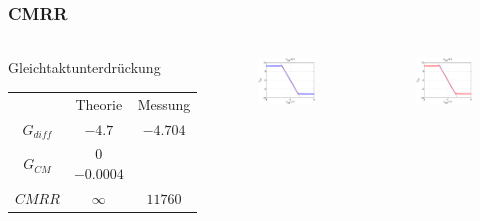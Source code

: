\begin{frame}
\frametitle{CMRR}
\framesubtitle{}
    \begin{columns}[c]
    \begin{block}{Gleichtaktunterdrückung}
        \begin{tabular}{c|c|c}
            &Theorie&Messung\\
            $G_{diff}$ & $-4.7$ &$-4.704$ \\
            $G_{CM}$ & $0$ $-0.0004$& \\
            $CMRR$ & $\infty$ & $11760$
        \end{tabular}
    \end{block}
    \begin{figure}[H]
    \begin{center}
            \includegraphics[scale=0.3]{./img/plots/Auf_3_Ucm_0.eps}
    \end{center}
    \end{figure}
    \begin{figure}[H]
    \begin{center}
            \includegraphics[scale=0.3]{./img/plots/Auf_3_Ucm_5.eps}

\end{center}
\end{figure}
\end{columns}
\end{frame}
